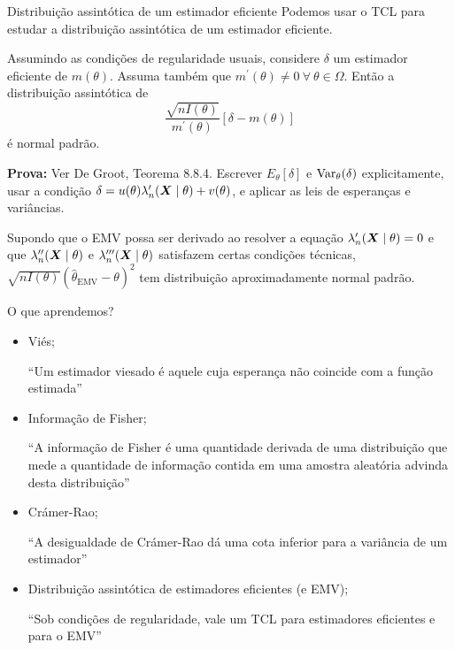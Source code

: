 \begin{frame}{Distribuição assintótica de um estimador eficiente}
Podemos usar o TCL para estudar a distribuição assintótica de um estimador eficiente.
\begin{theo}
 Assumindo as condições de regularidade usuais, considere $\delta$ um estimador eficiente de $m(\theta)$.
 Assuma também que $m^\prime(\theta) \neq 0\: \forall\: \theta \in \Omega$.
 Então a distribuição assintótica de 
 \[\frac{\sqrt{nI(\theta)}}{m^\prime(\theta)} \left[ \delta - m(\theta) \right] \]
 é normal padrão.
 
\end{theo}
\textbf{Prova:} Ver De Groot, Teorema 8.8.4.
Escrever $E_\theta[\delta]$ e $\operatorname{Var}_\theta(\delta)$ explicitamente, usar a condição $\delta = u(\theta)\lambda_n^\prime(\boldsymbol{X} \mid \theta) + v(\theta)$, e aplicar as leis de esperanças e variâncias. 

\begin{obs}
 Supondo que o EMV possa ser derivado ao resolver a equação $\lambda_n^\prime(\boldsymbol{X} \mid \theta) = 0$ e que $\lambda_n^{\prime\prime}(\boldsymbol{X} \mid \theta)$ e $\lambda_n^{\prime\prime\prime}(\boldsymbol{X} \mid \theta)$ satisfazem certas condições técnicas, $\sqrt{nI(\theta)} \left(\hat{\theta}_{\text{EMV}}-\theta\right)^2$ tem distribuição aproximadamente normal padrão.
\end{obs}

\end{frame}




\begin{frame}{O que aprendemos?}
\begin{itemize}
  \item[\faLightbulbO] Viés;
    
    ``Um estimador viesado é aquele cuja esperança não coincide com a função estimada''
    
   \item[\faLightbulbO] Informação de Fisher;
   
   ``A informação de Fisher é uma quantidade derivada de uma distribuição que mede a quantidade de informação contida em uma amostra aleatória advinda desta distribuição''
   
    \item[\faLightbulbO] Crámer-Rao;
    
    ``A desigualdade de Crámer-Rao dá uma cota inferior para a variância de um estimador''    
    
    \item[\faLightbulbO] Distribuição assintótica de estimadores eficientes (e EMV);
    
    ``Sob condições de regularidade, vale um TCL para estimadores eficientes e para o EMV''    
    
   
  \end{itemize}
 \end{frame}


